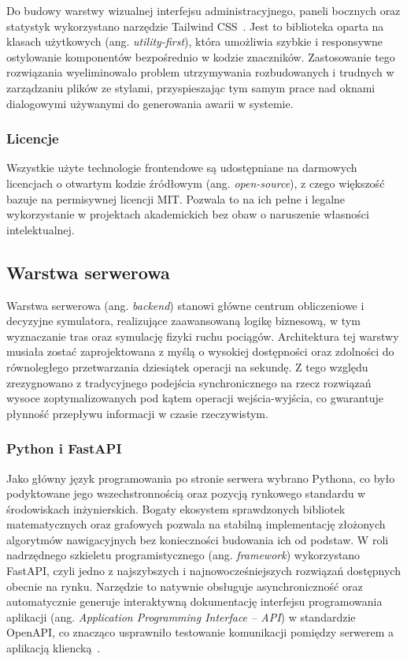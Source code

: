 \documentclass[twoside]{projektInzynierskiMS1z}
\begin{document}
Do budowy warstwy wizualnej interfejsu administracyjnego, paneli bocznych oraz
statystyk wykorzystano narzędzie Tailwind CSS~\cite{tailwind}. Jest to biblioteka
oparta na klasach użytkowych (ang. \emph{utility-first}), która umożliwia szybkie
i responsywne ostylowanie komponentów bezpośrednio w kodzie znaczników. Zastosowanie
tego rozwiązania wyeliminowało problem utrzymywania rozbudowanych i trudnych
w zarządzaniu plików ze stylami, przyspieszając tym samym prace nad oknami dialogowymi
używanymi do generowania awarii w systemie.

\subsubsection{Licencje}

Wszystkie użyte technologie frontendowe są udostępniane na darmowych licencjach
o otwartym kodzie źródłowym (ang. \emph{open-source}), z czego większość bazuje na
permisywnej licencji MIT. Pozwala to na ich pełne i legalne wykorzystanie w projektach
akademickich bez obaw o naruszenie własności intelektualnej.

\subsection{Warstwa serwerowa}

Warstwa serwerowa (ang. \emph{backend}) stanowi główne centrum obliczeniowe i decyzyjne
symulatora, realizujące zaawansowaną logikę biznesową, w tym wyznaczanie tras oraz
symulację fizyki ruchu pociągów. Architektura tej warstwy musiała zostać zaprojektowana
z myślą o wysokiej dostępności oraz zdolności do równoległego przetwarzania dziesiątek
operacji na sekundę. Z tego względu zrezygnowano z tradycyjnego podejścia
synchronicznego na rzecz rozwiązań wysoce zoptymalizowanych pod kątem operacji
wejścia-wyjścia, co gwarantuje płynność przepływu informacji w czasie rzeczywistym.

\subsubsection{Python i FastAPI}

Jako główny język programowania po stronie serwera wybrano Pythona, co było podyktowane
jego wszechstronnością oraz pozycją rynkowego standardu w środowiskach inżynierskich.
Bogaty ekosystem sprawdzonych bibliotek matematycznych oraz grafowych pozwala na
stabilną implementację złożonych algorytmów nawigacyjnych bez konieczności budowania
ich od podstaw. W roli nadrzędnego szkieletu programistycznego (ang. \emph{framework})
wykorzystano FastAPI, czyli jedno z najszybszych i najnowocześniejszych rozwiązań
dostępnych obecnie na rynku. Narzędzie to natywnie obsługuje asynchroniczność oraz
automatycznie generuje interaktywną dokumentację interfejsu programowania aplikacji
(ang. \emph{Application Programming Interface -- API}) w standardzie OpenAPI, co znacząco
usprawniło testowanie komunikacji pomiędzy serwerem a aplikacją kliencką~\cite{fastapi}.
\end{document}
